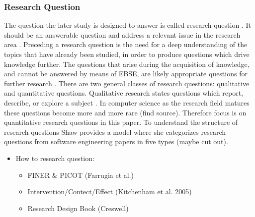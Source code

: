 \subsubsection{Research Question}

The question the later study is designed to answer is called research question \cite{Vickers}. It should be an answerable question and address a relevant issue in the research area \cite{Dyba2005}. Preceding a research question is the need for a deep understanding of the topics that have already been studied, in order to produce questions which drive knowledge further. The questions that arise during the acquisition of knowledge, and cannot be answered by means of EBSE, are likely appropriate questions for further research \cite{Farrugia2009}. \newline
There are two general classes of research questions: qualitative and quantitative questions. Qualitative research states questions which report, describe, or explore a subject \cite[p. 139-141]{Creswell2014}. In computer science as the research field matures these questions become more and more rare {\color{red} (find source)}. Therefore focus is on quantitative research questions in this paper. \newline
To understand the structure of research questions Shaw provides a model where she categorizes research questions from software engineering papers in five types \cite{Shaw2002} {\color{red} (maybe cut out)}. \newline


\begin{itemize}
	\item How to research question:
		\begin{itemize}
			\item FINER \& PICOT  {\color{red} (Farrugia et al.)}
			\item Intervention/Contect/Effect  {\color{red} (Kitchenham et al. 2005)}
			\item Research Design Book  {\color{red} (Creswell)}
		\end{itemize}
\end{itemize}



